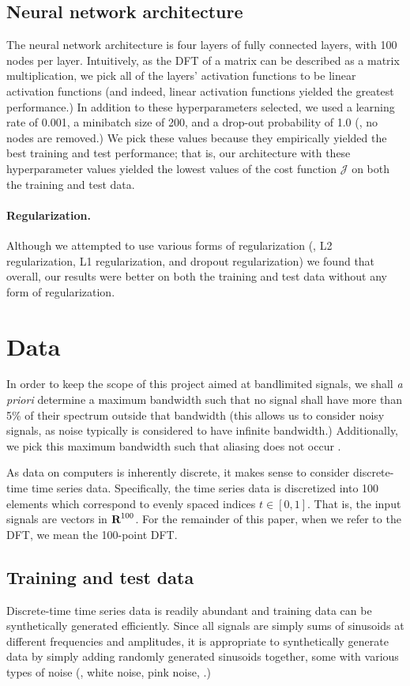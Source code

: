 \documentclass[12pt]{article}
\begin{document}
\subsection{Neural network architecture} The neural network architecture is four layers of 
fully connected layers, with 100 nodes per layer. Intuitively, as the DFT of a matrix can be described 
as a matrix multiplication, we pick all of the layers' activation functions to be linear activation 
functions (and indeed, linear activation functions yielded the greatest performance.) In addition to these 
hyperparameters selected, we used a learning rate of 0.001, a minibatch size of 200, and a drop-out 
probability of 1.0 (\ie, no nodes are removed.) We pick these values because they empirically yielded 
the best training and test performance; that is, our architecture with these hyperparameter values 
yielded the lowest values of the cost function $\mathcal J$ on both the training and test data.

\paragraph{Regularization.} Although we attempted to use various forms of regularization (\ie, L2 regularization, 
L1 regularization, and dropout regularization) we found that overall, our results were better on both the training 
and test data without any form of regularization.

\section{Data}

In order to keep the scope of this project aimed at bandlimited signals, we shall \emph{a priori}
determine a maximum bandwidth such that no signal shall have more than 5\% of their spectrum outside
that bandwidth (this allows us to consider noisy signals, as noise typically is considered to have 
infinite bandwidth.) Additionally, we pick this maximum bandwidth such that aliasing does not 
occur \cite{OS:99}.

As data on computers is inherently discrete, it makes sense to consider discrete-time time series data.
Specifically, the time series data is discretized into 100 elements which correspond to evenly spaced 
indices $t \in [0,1]$. That is, the input signals are vectors in ${\mbox{\bf R}}^{100}$. For the remainder of
this paper, when we refer to the DFT, we mean the 100-point DFT. 


\subsection{Training and test data} Discrete-time time series data is readily abundant and 
training data can be synthetically generated efficiently. Since all signals are simply sums of 
sinusoids at different frequencies and amplitudes, it is appropriate to synthetically generate
data by simply adding randomly generated sinusoids together, some with various types of noise 
(\eg, white noise, pink noise, \etc.)
\end{document}
